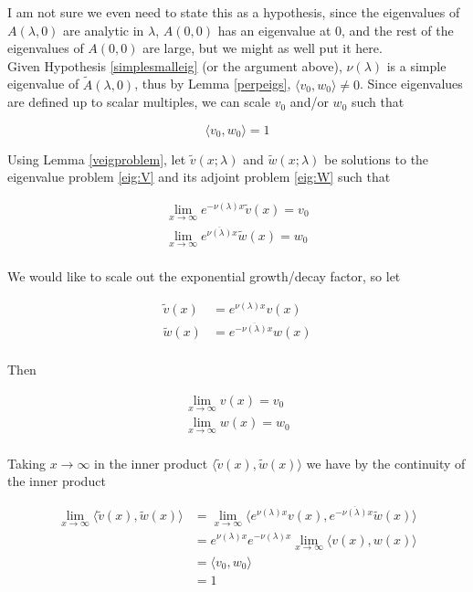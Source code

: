 \documentclass[12pt]{article}
\begin{document}
I am not sure we even need to state this as a hypothesis, since the eigenvalues of $A(\lambda, 0)$ are analytic in $\lambda$, $A(0, 0)$ has an eigenvalue at 0, and the rest of the eigenvalues of $A(0, 0)$ are large, but we might as well put it here.\\

Given Hypothesis \ref{simplesmalleig} (or the argument above), $\nu(\lambda)$ is a simple eigenvalue of $\tilde{A}(\lambda, 0)$, thus by Lemma \ref{perpeigs}, $\langle v_0, w_0 \rangle \neq 0$. Since eigenvalues are defined up to scalar multiples, we can scale $v_0$ and/or $w_0$ such that

\[
\langle v_0, w_0 \rangle = 1
\]
 

Using Lemma \ref{veigproblem}, let $\tilde{v}(x; \lambda)$ and $\tilde{w}(x; \lambda)$ be solutions to the eigenvalue problem \eqref{eig:V} and its adjoint problem \eqref{eig:W} such that

\begin{align*}
\lim_{x \rightarrow \infty} e^{-\nu(\lambda) x} \tilde{v}(x) = v_0 \\
\lim_{x \rightarrow \infty} e^{\overline{\nu(\lambda)} x} \tilde{w}(x) = w_0 \\
\end{align*}

We would like to scale out the exponential growth/decay factor, so let

\begin{align*}
\tilde{v}(x) &= e^{\nu(\lambda) x } v(x) \\
\tilde{w}(x) &= e^{-\overline{\nu(\lambda)} x } w(x) \\
\end{align*}

Then

\begin{align*}
\lim_{x \rightarrow \infty} v(x) = v_0 \\
\lim_{x \rightarrow \infty} w(x) = w_0 \\
\end{align*}

Taking $x \rightarrow \infty$ in the inner product $\langle \tilde{v}(x), \tilde{w}(x) \rangle$ we have by the continuity of the inner product

\begin{align*}
\lim_{x \rightarrow \infty} \langle \tilde{v}(x), \tilde{w}(x) \rangle
&= \lim_{x \rightarrow \infty} \langle e^{\nu(\lambda) x } v(x), e^{-\overline{\nu(\lambda)} x} \tilde{w}(x) \rangle \\
&= e^{\nu(\lambda) x } e^{-\nu(\lambda) x } \lim_{x \rightarrow \infty} \langle v(x), w(x) \rangle \\
&= \langle v_0, w_0 \rangle \\
&= 1
\end{align*}
\end{document}
